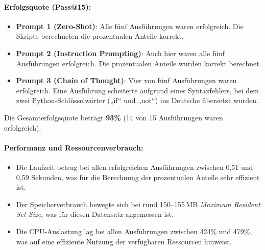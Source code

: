 \documentclass[11pt,a4paper]{article}
\begin{document}
\paragraph{Erfolgsquote (Pass@15):}
\begin{itemize}
    \item \textbf{Prompt 1 (Zero-Shot)}: Alle fünf Ausführungen waren erfolgreich. Die Skripte berechneten die prozentualen Anteile korrekt.
    \item \textbf{Prompt 2 (Instruction Prompting)}: Auch hier waren alle fünf Ausführungen erfolgreich. Die prozentualen Anteile wurden korrekt berechnet.
    \item \textbf{Prompt 3 (Chain of Thought)}: Vier von fünf Ausführungen waren erfolgreich. Eine Ausführung scheiterte aufgrund eines Syntaxfehlers, bei dem zwei Python-Schlüsselwörter („if“ und „not“) ins Deutsche übersetzt wurden.
\end{itemize}
Die Gesamterfolgsquote beträgt \textbf{93\%} (14 von 15 Ausführungen waren erfolgreich).
\begin{table}[h]
    \centering
    \caption{Ergebnisse von Testfall 3}
    \label{tab:auswertung_testfall3}
\end{table}

\paragraph{Performanz und Ressourcenverbrauch:}
\begin{itemize}
    \item Die Laufzeit betrug bei allen erfolgreichen Ausführungen zwischen 0,51 und 0,59 Sekunden, was für die Berechnung der prozentualen Anteile sehr effizient ist.
    \item Der Speicherverbrauch bewegte sich bei rund 150--155\,MB \emph{Maximum Resident Set Size}, was für diesen Datensatz angemessen ist.
    \item Die CPU-Auslastung lag bei allen Ausführungen zwischen 424\% und 479\%, was auf eine effiziente Nutzung der verfügbaren Ressourcen hinweist.
\end{itemize}
\end{document}
